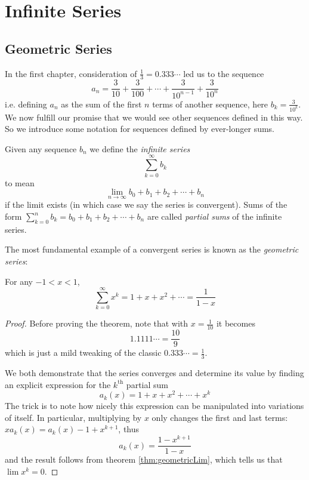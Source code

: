 \section{Infinite Series}
\subsection{Geometric Series}
In the first chapter, consideration of $\frac{1}{3}=0.333\cdots$ led us to the sequence
\[
a_n  = \frac{3}{10} + \frac{3}{100} + \cdots + \frac{3}{10^{n-1}} + \frac{3}{10^n}
\]
i.e. defining $a_n$ as the sum of the first $n$ terms of another sequence, here $b_k=\frac{3}{10^k}$.  We now fulfill our promise that we would see other sequences defined in this way.
So we introduce some notation for sequences defined by ever-longer sums.
\begin{defn}\label{def:infSer}
Given any sequence $b_n$ we define the \emph{infinite series}
\[
\sum_{k=0}^{\infty} b_k
\]
to mean
\[
\lim_{n \to \infty} b_0+b_1+b_2+ \cdots + b_n
\]
if the limit exists (in which case we say the series is convergent). Sums of the form $\sum_{k=0}^{n} b_k = b_0+b_1+b_2+ \cdots + b_n$ are called \emph{partial sums} of the infinite series.
\end{defn}

The most fundamental example of a convergent series is known as the \emph{geometric series}: 
\begin{thm}\label{thm:geometricSeries}
For any $-1<x<1$,
\[
\sum_{k=0}^{\infty} x^k = 1 + x + x^2 + \cdots = \frac{1}{1-x}
\]
\end{thm}
\begin{proof}
Before proving the theorem, note that with $x=\frac{1}{10}$ it becomes
\[1.1111\cdots = \frac{10}{9}\]
which is just a mild tweaking of the classic $0.333\cdots = \frac{1}{3}$.

We both demonstrate that the series converges and determine its value by finding an explicit expression for the $k^{\mbox{th}}$ partial sum
\[
a_k(x) = 1 + x + x^2 + \cdots + x^k
\]
The trick is to note how nicely this expression can be manipulated into variations of itself. In particular, multiplying by $x$ only changes the first and last terms: $xa_k(x) = a_k(x) - 1 + x^{k+1}$, thus
\[
a_k(x) = \frac{1-x^{k+1}}{1-x}
\]
and the result follows from theorem \ref{thm:geometricLim}, which tells us that $\lim x^k = 0$.
\end{proof}

